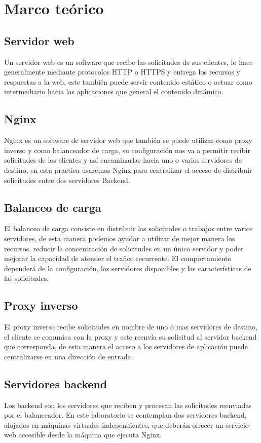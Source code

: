 \documentclass[12pt,letterpaper]{article}
\begin{document}
\section{Marco teórico}
\subsection{Servidor web}
Un servidor web es un software que recibe las solicitudes de sus clientes, lo hace generalmente mediante protocolos HTTP o HTTPS y entrega los recursos y respuestas a la web, este también puede servir contenido estático o actuar como intermediario hacia las aplicaciones que general el contenido dinámico. 


\subsection{Nginx}

Nginx es un software de servidor web que también se puede utilizar como proxy inverso y como balanceador de carga, su configuración nos va a permitir recibir solicitudes de los clientes y así encaminarlas hacia uno o varios servidores de destino, en esta practica usaremos Nginx para centralizar el acceso de distribuir solicitudes entre dos servidores Backend.

\subsection{Balanceo de carga}
El balanceo de carga consiste en distribuir las solicitudes o trabajos entre varios servidores, de esta manera podemos ayudar a utilizar de mejor manera los recursos, reducir la concentración de solicitudes en un único servidor y poder mejorar la capacidad de atender el trafico recurrente. El comportamiento dependerá de la configuración, los servidores disponibles y las características de las solicitudes.

\subsection{Proxy inverso}
El proxy inverso recibe solicitudes en nombre de uno o mas servidores de destino, el cliente se comunica con la proxy y este reenvía su solicitud al servidor backend que corresponda, de esta manera el acceso a los servidores de aplicación puede centralizarse en una dirección de entrada.

\subsection{Servidores backend}
Los backend son los servidores que reciben y procesan las solicitudes reenviadas por el balanceador. En este laboratorio se contemplan dos servidores backend, alojados en máquinas virtuales independientes, que deberán ofrecer un servicio web accesible desde la máquina que ejecuta Nginx.
\end{document}
